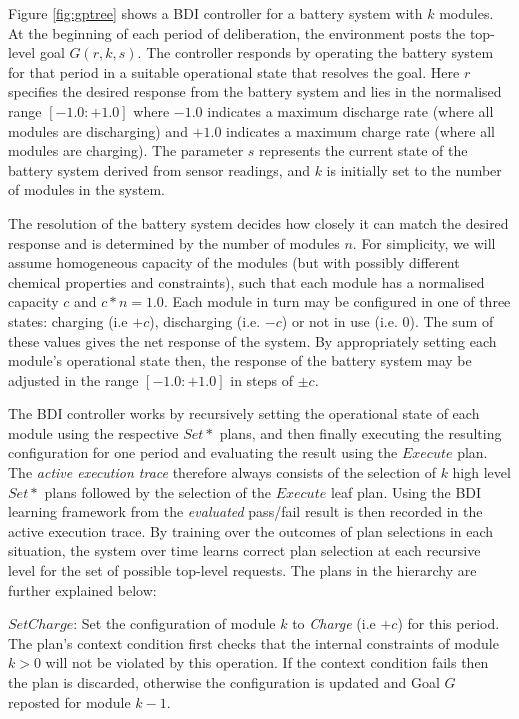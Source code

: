 Figure \ref{fig:gptree} shows a BDI controller for a battery system with $k$ modules. At the beginning of each period of deliberation, the environment posts the top-level goal $G(r,k,s)$. The controller responds by operating the battery system for that period in a suitable operational state that resolves the goal. Here $r$ specifies the desired response from the battery system and lies in the normalised range $[-1.0:+1.0]$ where $-1.0$ indicates a maximum discharge rate (where all modules are discharging) and $+1.0$ indicates a maximum charge rate (where all modules are charging). The parameter $s$ represents the current state of the battery system derived from sensor readings, and $k$ is initially set to the number of modules in the system. 

The resolution of the battery system decides how closely it can match the desired response and is determined by the number of modules $n$. For simplicity, we will assume homogeneous capacity of the modules (but with possibly different chemical properties and constraints), such that each module has a normalised capacity $c$ and $c*n=1.0$. Each module in turn may be configured in one of three states: charging (i.e $+c$), discharging (i.e. $-c$) or not in use (i.e. $0$). The sum of these values gives the net response of the system. By appropriately setting each module's operational state then, the response of the battery system may be adjusted in the range $[-1.0:+1.0]$ in steps of $\pm c$.

The BDI controller works by recursively setting the operational state of each module using the respective $Set*$ plans, and then finally executing the resulting configuration for one period and evaluating the result using the $Execute$ plan. The {\em active execution trace} therefore always consists of the selection of $k$ high level $Set*$ plans followed by the selection of the $Execute$ leaf plan. Using the BDI learning framework from \cite{Singh:RAS10} the {\em evaluated} pass/fail result is then recorded in the active execution trace. By training over the outcomes of plan selections in each situation, the system over time learns correct plan selection at each recursive level for the set of possible top-level requests. The plans in the hierarchy are further explained below:

$SetCharge$: Set the configuration of module $k$ to {\em Charge} (i.e $+c$) for this period. The plan's context condition first checks that the internal constraints of module $k>0$ will not be violated by this operation. If the context condition fails then the plan is discarded, otherwise the configuration is updated and Goal $G$ reposted for module $k-1$.

